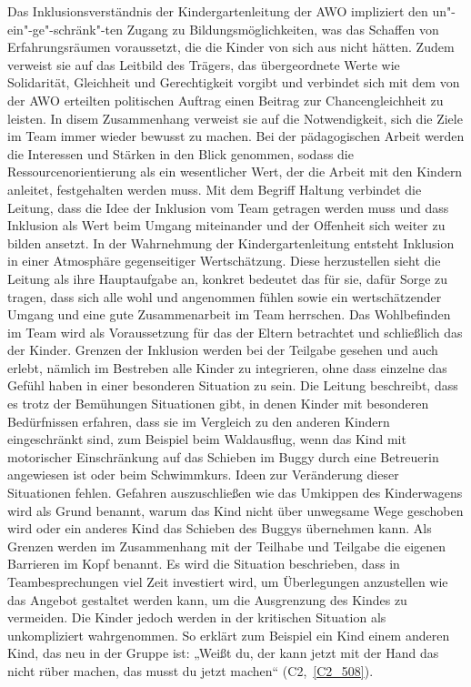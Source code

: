 Das Inklusionsverständnis der Kindergartenleitung der AWO impliziert den un"-ein"-ge"-schränk"-ten Zugang zu Bildungsmöglichkeiten, was das Schaffen von Erfahrungsräumen voraussetzt, die die Kinder von sich aus nicht hätten. Zudem verweist sie auf das Leitbild des Trägers, das übergeordnete Werte wie Solidarität, Gleichheit und Gerechtigkeit vorgibt und verbindet sich mit dem von der AWO erteilten politischen Auftrag einen Beitrag zur Chancengleichheit zu leisten. In disem Zusammenhang verweist sie auf die Notwendigkeit, sich die Ziele im Team immer wieder bewusst zu machen. Bei der pädagogischen Arbeit werden die Interessen und Stärken in den Blick genommen, sodass die Ressourcenorientierung als ein wesentlicher Wert, der die Arbeit mit den Kindern anleitet, festgehalten werden muss. 
Mit dem Begriff Haltung verbindet die Leitung, dass die Idee der Inklusion vom Team getragen werden muss und dass Inklusion als Wert  beim Umgang miteinander und der Offenheit sich weiter zu bilden ansetzt. In der Wahrnehmung der Kindergartenleitung entsteht Inklusion in einer Atmosphäre gegenseitiger Wertschätzung. Diese herzustellen sieht die Leitung als ihre Hauptaufgabe an, konkret bedeutet das für sie, dafür Sorge zu tragen, dass sich alle wohl und angenommen fühlen sowie ein wertschätzender Umgang und eine gute Zusammenarbeit im Team herrschen. Das Wohlbefinden im Team wird als Voraussetzung für das der Eltern betrachtet und schließlich das der Kinder. 
Grenzen der Inklusion werden bei der Teilgabe gesehen und auch erlebt, nämlich im Bestreben alle Kinder zu integrieren, ohne dass einzelne das Gefühl haben in einer besonderen Situation zu sein.    
Die Leitung beschreibt, dass es trotz der Bemühungen Situationen gibt, in denen Kinder mit besonderen Bedürfnissen erfahren, dass sie im Vergleich zu den anderen Kindern eingeschränkt sind, zum Beispiel beim Waldausflug, wenn das Kind mit motorischer Einschränkung auf das Schieben im Buggy durch eine Betreuerin angewiesen ist oder beim Schwimmkurs. Ideen zur Veränderung dieser Situationen fehlen. Gefahren auszuschließen wie das Umkippen des Kinderwagens wird als Grund benannt, warum das Kind nicht über unwegsame Wege geschoben wird oder ein anderes Kind das Schieben des Buggys übernehmen kann. Als Grenzen werden im Zusammenhang mit der Teilhabe und Teilgabe die eigenen Barrieren im Kopf benannt. Es wird die Situation beschrieben, dass in Teambesprechungen viel Zeit investiert wird, um Überlegungen anzustellen wie das Angebot gestaltet werden kann, um die Ausgrenzung des Kindes zu vermeiden. Die Kinder jedoch werden in der kritischen Situation als unkompliziert wahrgenommen. So erklärt zum Beispiel ein Kind einem anderen Kind, das neu in der Gruppe ist: „Weißt du, der kann jetzt mit der Hand das nicht rüber machen, das musst du jetzt machen“ (C2,~\ref{C2_508}).
